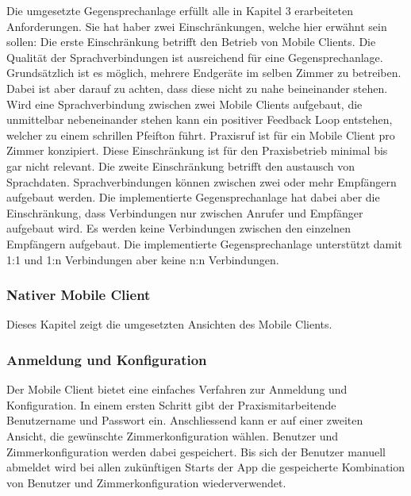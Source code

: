 Die umgesetzte Gegensprechanlage erfüllt alle in Kapitel 3 erarbeiteten Anforderungen.
Sie hat haber zwei Einschränkungen, welche hier erwähnt sein sollen:
Die erste Einschränkung betrifft den Betrieb von Mobile Clients.
Die Qualität der Sprachverbindungen ist ausreichend für eine Gegensprechanlage.
Grundsätzlich ist es möglich, mehrere Endgeräte im selben Zimmer zu betreiben.
Dabei ist aber darauf zu achten, dass diese nicht zu nahe beineinander stehen.
Wird eine Sprachverbindung zwischen zwei Mobile Clients aufgebaut, die unmittelbar nebeneinander stehen kann ein positiver Feedback Loop entstehen, welcher zu einem schrillen Pfeifton führt.
Praxisruf ist für ein Mobile Client pro Zimmer konzipiert.
Diese Einschränkung ist für den Praxisbetrieb minimal bis gar nicht relevant.
Die zweite Einschränkung betrifft den austausch von Sprachdaten.
Sprachverbindungen können zwischen zwei oder mehr Empfängern aufgebaut werden.
Die implementierte Gegensprechanlage hat dabei aber die Einschränkung, dass Verbindungen nur zwischen Anrufer und Empfänger aufgebaut wird.
Es werden keine Verbindungen zwischen den einzelnen Empfängern aufgebaut.
Die implementierte Gegensprechanlage unterstützt damit 1:1 und 1:n Verbindungen aber keine n:n Verbindungen.

\clearpage

\subsubsection{Nativer Mobile Client}

Dieses Kapitel zeigt die umgesetzten Ansichten des Mobile Clients.

\subsubsection{Anmeldung und Konfiguration}

Der Mobile Client bietet eine einfaches Verfahren zur Anmeldung und Konfiguration.
In einem ersten Schritt gibt der Praxismitarbeitende Benutzername und Passwort ein.
Anschliessend kann er auf einer zweiten Ansicht, die gewünschte Zimmerkonfiguration wählen.
Benutzer und Zimmerkonfiguration werden dabei gespeichert.
Bis sich der Benutzer manuell abmeldet wird bei allen zukünftigen Starts der App die gespeicherte Kombination von Benutzer und Zimmerkonfiguration wiederverwendet.

